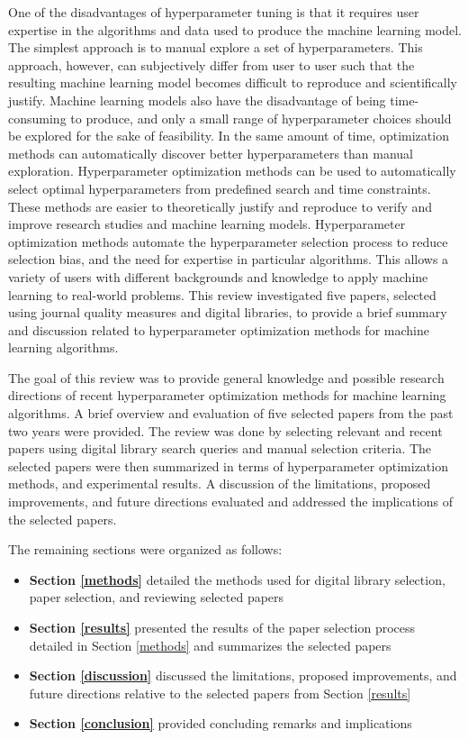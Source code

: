 One of the disadvantages of hyperparameter tuning is that it requires user expertise in the algorithms and data used to produce the machine learning model. The simplest approach is to manual explore a set of hyperparameters. This approach, however, can subjectively differ from user to user such that the resulting machine learning model becomes difficult to reproduce and scientifically justify. Machine learning models also have the disadvantage of being time-consuming to produce, and only a small range of hyperparameter choices should be explored for the sake of feasibility. In the same amount of time, optimization methods can automatically discover better hyperparameters than manual exploration. Hyperparameter optimization methods can be used to automatically select optimal hyperparameters from predefined search and time constraints. These methods are easier to theoretically justify and reproduce to verify and improve research studies and machine learning models. Hyperparameter optimization methods automate the hyperparameter selection process to reduce selection bias, and the need for expertise in particular algorithms. This allows a variety of users with different backgrounds and knowledge to apply machine learning to real-world problems. This review investigated five papers, selected using journal quality measures and digital libraries, to provide a brief summary and discussion related to hyperparameter optimization methods for machine learning algorithms.

The goal of this review was to provide general knowledge and possible research directions of recent hyperparameter optimization methods for machine learning algorithms. A brief overview and evaluation of five selected papers from the past two years were provided. The review was done by selecting relevant and recent papers using digital library search queries and manual selection criteria. The selected papers were then summarized in terms of hyperparameter optimization methods, and experimental results. A discussion of the limitations, proposed improvements, and future directions evaluated and addressed the implications of the selected papers.

The remaining sections were organized as follows:

\begin{itemize}
  \item \textbf{Section \ref{methods}} detailed the methods used for digital library selection, paper selection, and reviewing selected papers
  \item \textbf{Section \ref{results}} presented the results of the paper selection process detailed in Section \ref{methods} and summarizes the selected papers
  \item \textbf{Section \ref{discussion}} discussed the limitations, proposed improvements, and future directions relative to the selected papers from Section \ref{results}
  \item \textbf{Section \ref{conclusion}} provided concluding remarks and implications
\end{itemize}



